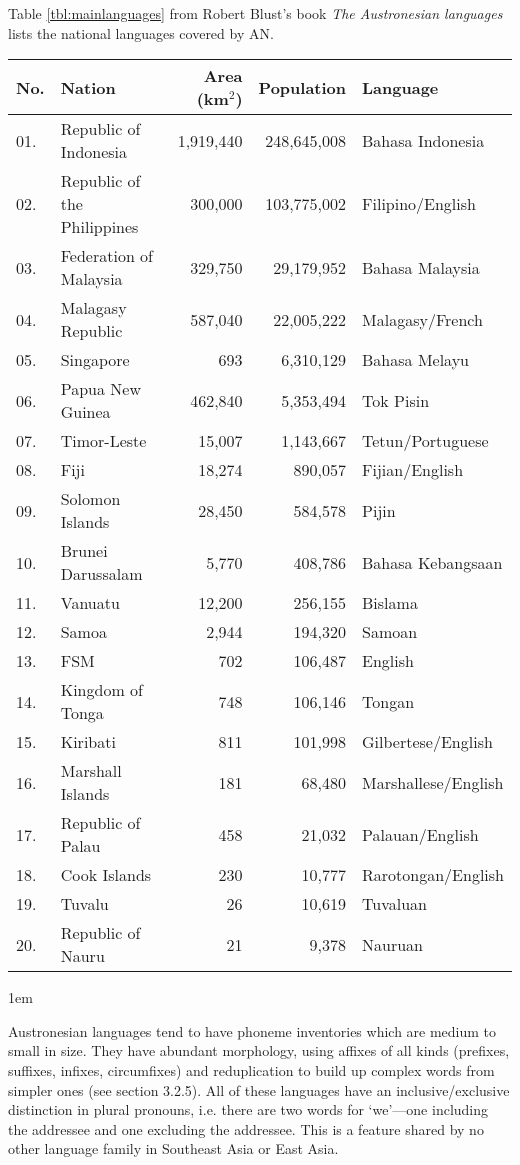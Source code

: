 Table \ref{tbl:mainlanguages} from Robert Blust's book \textit{The Austronesian languages} lists the national languages covered by AN.


\label{tbl:mainlanguages}
\begin{longtable}{p{0.8cm}lrrl}
\toprule
No. &Nation &Area (km$^2$) &Population &Language\\
\midrule
01. &Republic of Indonesia &1,919,440 &248,645,008 &Bahasa Indonesia\\
02. &Republic of the Philippines &300,000 &103,775,002 &Filipino/English\\
03. &Federation of Malaysia &329,750 &29,179,952 &Bahasa Malaysia\\
04. &Malagasy Republic &587,040 &22,005,222 &Malagasy/French\\
05. &Singapore &693 &6,310,129 &Bahasa Melayu\\
06. &Papua New Guinea &462,840 &5,353,494 &Tok Pisin\\
07. &Timor-Leste &15,007 &1,143,667 &Tetun/Portuguese\\
08. &Fiji &18,274 &890,057 &Fijian/English\\
09. &Solomon Islands &28,450 &584,578 &Pijin\\
10. &Brunei Darussalam &5,770 &408,786 &Bahasa Kebangsaan\\
11. &Vanuatu &12,200 &256,155 &Bislama\\
12. &Samoa &2,944 &194,320 &Samoan\\
13. &FSM &702 &106,487 &English\\
14. &Kingdom of Tonga &748 &106,146 &Tongan\\
15. &Kiribati &811 &101,998 &Gilbertese/English\\
16. &Marshall Islands &181 &68,480 &Marshallese/English\\
17. &Republic of Palau &458 &21,032 &Palauan/English\\
18. &Cook Islands &230 &10,777 &Rarotongan/English\\
19. &Tuvalu &26 &10,619 &Tuvaluan\\
20. &Republic of Nauru &21 &9,378 &Nauruan\\
\bottomrule
\end{longtable}

\parindent1em

Austronesian languages tend to have phoneme inventories which are
medium to small in size. They have abundant morphology,
using affixes of all kinds (prefixes, suffixes, infixes, circumfixes) and
reduplication to build up complex words from simpler ones (see section
3.2.5). All of these languages have an inclusive/exclusive distinction in plural
pronouns, i.e. there are two words for ‘we’—one including the addressee
and one excluding the addressee. This is a feature shared by no other language
family in Southeast Asia or East Asia. 


